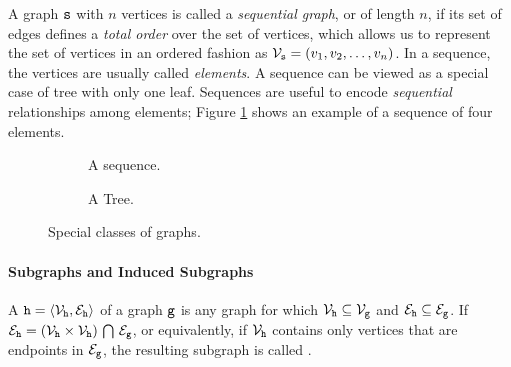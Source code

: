 A graph $\mathtt{s}$ with $n$ vertices is called a \emph{sequential graph}, or  of length $n$, if its set of edges defines a \emph{total order} over the set of vertices, which allows us to represent the set of vertices in an ordered fashion as $\Nodes{s} = (v_1, v_2, \ldots, v_n)$. In a sequence, the vertices are usually called \emph{elements}. A sequence can be viewed as a special case of tree with only one leaf. Sequences are useful to encode \emph{sequential} relationships among elements; Figure \ref{fig:sequence} shows an example of a sequence of four elements.
\begin{figure*}
    \begin{subfigure}[b]{0.49\linewidth}
        \centering
        \resizebox{.8\textwidth}{!}{}
        \caption{A sequence.}
        \label{fig:sequence}
    \end{subfigure}
    \begin{subfigure}[b]{0.49\linewidth}
        \centering
        \resizebox{.8\textwidth}{!}{}
        \caption{A Tree.}
        \label{fig:tree}
    \end{subfigure}
    \caption{Special classes of graphs.}
\end{figure*}

\paragraph{Subgraphs and Induced Subgraphs} A 
$\Graph{h} = \langle \Nodes{h}, \Edges{h} \rangle$ of a graph $\mathtt{g}$ is any graph for which $\Nodes{h} \subseteq \Nodes{g}$ and  $\Edges{h} \subseteq \Edges{g}$. If $\Edges{h} = (\Nodes{h} \times \Nodes{h}) \Inter \Edges{g}$, or equivalently, if $\Nodes{h}$ contains only vertices that are endpoints in $\Edges{g}$, the resulting subgraph is called .

